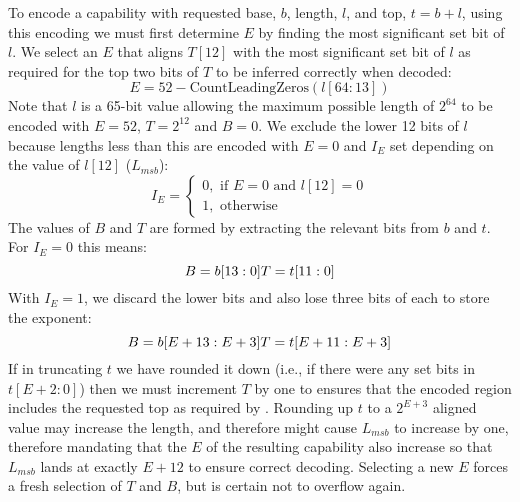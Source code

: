 To encode a capability with requested base, $b$, length, $l$, and top, $t = b + l$, using this encoding we must first determine $E$ by finding the most significant set bit of $l$. We select an $E$ that aligns $T[12]$ with the most significant set bit of $l$ as required for the top two bits of $T$ to be inferred correctly when decoded:
\[
E = 52 - \text{CountLeadingZeros}(l[64:13])
\]
Note that $l$ is a 65-bit value allowing the maximum possible length of $2^{64}$ to be encoded with $E=52$, $T=2^{12}$ and $B=0$. We exclude the lower 12 bits of $l$ because lengths less than this are encoded with $E = 0$ and $I_E$ set depending on the value of $l[12]$ ($L_{msb}$):
\[
I_E =
\begin{cases}
0,\text{ if }E=0\text{ and }l[12] = 0 \\
1,\text{ otherwise}
\end{cases}
\]
The values of $B$ and $T$ are formed by extracting the relevant bits from $b$ and $t$. For $I_E = 0$ this means:
\[
B = b[13:0] \\
T = t[11:0]
\]
With $I_E = 1$, we discard the lower bits and also lose three bits of each to store the exponent:
\[
B = b[E+13:E+3] \\
T = t[E+11:E+3]
\]
If in truncating $t$ we have rounded it down (i.e., if there were any set bits in $t[E+2:0]$) then we must increment $T$ by one to ensures that the encoded region includes the requested top as required by .
Rounding up $t$ to a $2^{E+3}$ aligned value may increase the length, and therefore might cause $L_{msb}$ to increase by one, therefore mandating that the $E$ of the resulting capability also increase so that $L_{msb}$ lands at exactly $E+12$ to ensure correct decoding.
Selecting a new $E$ forces a fresh selection of $T$ and $B$, but is certain not to overflow again.

